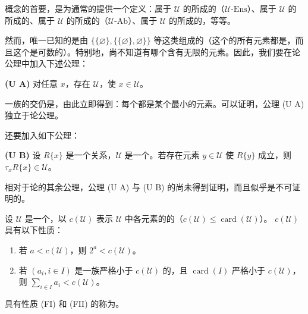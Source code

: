 概念的首要，是为通常的提供一个定义：属于 $\mathcal U$ 的所成的（$\mathcal U\text{-}\mathrm{Ens}$）、属于 $\mathcal U$ 的所成的、属于 $\mathcal U$ 的所成的（$\mathcal U\text{-}\mathrm{Ab}$）、属于 $\mathcal U$ 的所成的，等等。

然而，唯一已知的是由 $\{\{\varnothing\},\{\{\varnothing\},\varnothing\}\}$ 等这类组成的（这个的所有元素都是，而且这个是可数的）。特别地，尚不知道有哪个含有无限的元素。因此，我们要在论公理中加入下述公理：

\textbf{(U A)} 对任意 $x$，存在 $\mathcal U$，使 $x\in\mathcal U$。

一族的交仍是，由此立即得到：每个都是某个最小的元素。可以证明，公理 (U A) 独立于论公理。

还要加入如下公理：

\textbf{(U B)} 设 $R\{x\}$ 是一个关系，$\mathcal U$ 是一个。若存在元素 $y\in\mathcal U$ 使 $R\{y\}$ 成立，则 $\tau_xR\{x\}\in\mathcal U$。

相对于论的其余公理，公理 (U A) 与 (U B) 的尚未得到证明，而且似乎是不可证明的。

设 $\mathcal U$ 是一个，以 $c(\mathcal U)$ 表示 $\mathcal U$ 中各元素的的（$c(\mathcal U)\leq\operatorname{card}(\mathcal U)$）。 $c(\mathcal U)$ 具有以下性质：
\begin{enumerate}
\item[(FI)] 若 $a<c(\mathcal U)$，则 $2^a<c(\mathcal U)$。
\item[(FII)] 若 $(a_i,i\in I)$ 是一族严格小于 $c(\mathcal U)$ 的，且 $\operatorname{card}(I)$ 严格小于 $c(\mathcal U)$，则 $\sum_{i\in I}a_i<c(\mathcal U)$。
\end{enumerate}
具有性质 (FI) 和 (FII) 的称为。

